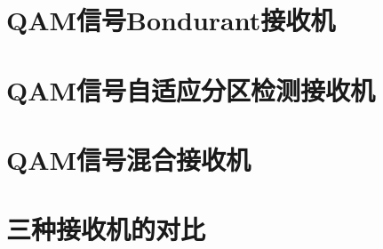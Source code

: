 \section{QAM信号Bondurant接收机}




\section{QAM信号自适应分区检测接收机}


\section{QAM信号混合接收机}


\section{三种接收机的对比}

